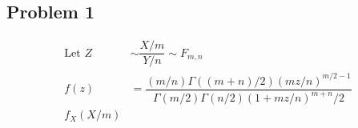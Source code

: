 \documentclass{article}
\begin{document}
\begin{flushleft}
\section*{Problem 1}
\begin{align*}
\text{Let } Z&\sim \dfrac{X/m}{Y/n} \sim F_{m,n}\\
f(z)&=\dfrac{(m/n)\Gamma((m+n)/2)(mz/n)^{m/2-1}}{\Gamma(m/2)\Gamma(n/2)(1+mz/n)^{m+n}/2}\\
f_X(X/m)
\end{align*}





\end{flushleft}
\end{document}
